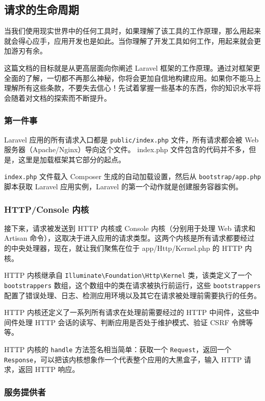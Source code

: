 \documentclass{progartcn}
\begin{document}
\subsection{请求的生命周期}

当我们使用现实世界中的任何工具时，如果理解了该工具的工作原理，那么用起来就会得心应手，应用开发也是如此。当你理解了开发工具如何工作，用起来就会更加游刃有余。

这篇文档的目标就是从更高层面向你阐述 Laravel 框架的工作原理。通过对框架更全面的了解，一切都不再那么神秘，你将会更加自信地构建应用。如果你不能马上理解所有这些条款，不要失去信心！先试着掌握一些基本的东西，你的知识水平将会随着对文档的探索而不断提升。

\subsubsection{第一件事}

Laravel 应用的所有请求入口都是 \verb|public/index.php| 文件，所有请求都会被 Web 服务器（Apache/Nginx）导向这个文件。 index.php 文件包含的代码并不多，但是，这里是加载框架其它部分的起点。

\verb|index.php| 文件载入 Composer 生成的自动加载设置，然后从 \verb|bootstrap/app.php| 脚本获取 Laravel 应用实例，Laravel 的第一个动作就是创建服务容器实例。

\subsubsection{HTTP/Console 内核}

接下来，请求被发送到 HTTP 内核或 Console 内核（分别用于处理 Web 请求和 Artisan 命令），这取决于进入应用的请求类型。这两个内核是所有请求都要经过的中央处理器，现在，就让我们聚焦在位于 app/Http/Kernel.php 的 HTTP 内核。

HTTP 内核继承自 \verb|Illuminate\Foundation\Http\Kernel| 类，该类定义了一个 \verb|bootstrappers| 数组，这个数组中的类在请求被执行前运行，这些 \verb|bootstrappers| 配置了错误处理、日志、检测应用环境以及其它在请求被处理前需要执行的任务。

HTTP 内核还定义了一系列所有请求在处理前需要经过的 HTTP 中间件，这些中间件处理 HTTP 会话的读写、判断应用是否处于维护模式、验证 CSRF 令牌等等。

HTTP 内核的 \verb|handle| 方法签名相当简单：获取一个 \verb|Request|，返回一个 \verb|Response|，可以把该内核想象作一个代表整个应用的大黑盒子，输入 HTTP 请求，返回 HTTP 响应。

\subsubsection{服务提供者}
\end{document}
